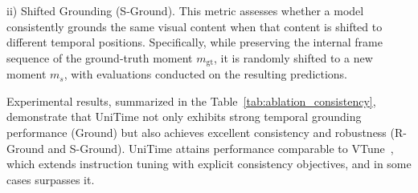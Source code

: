 ii) Shifted Grounding (S-Ground). This metric assesses whether a model consistently grounds the same visual content when that content is shifted to different temporal positions. Specifically, while preserving the internal frame sequence of the ground-truth moment $m_{\mathrm{gt}}$, it is randomly shifted to a new moment $m_s$, with evaluations conducted on the resulting predictions.

Experimental results, summarized in the Table~\ref{tab:ablation_consistency}, demonstrate that UniTime not only exhibits strong temporal grounding performance (Ground) but also achieves excellent consistency and robustness (R-Ground and S-Ground). UniTime attains performance comparable to VTune~\cite{jung2025consistency}, which extends instruction tuning with explicit consistency objectives, and in some cases surpasses it.

\begin{table}[t]
\caption{
\textbf{Grounding consistency evaluation of Video-MLLMs.} Relative consistency scores are in brackets.}
\vspace{3pt}
\centering
{}
\label{tab:ablation_consistency}
\end{table}

